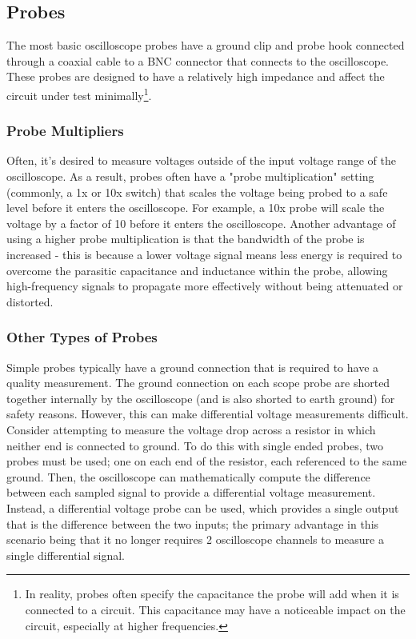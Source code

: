 \documentclass[main.tex]{subfiles}
\begin{document}

\subsection{Probes}
The most basic oscilloscope probes have a ground clip and probe hook connected through a coaxial cable to a BNC connector that connects to the oscilloscope. These probes are designed to have a relatively high impedance and affect the circuit under test minimally\footnote{In reality, probes often specify the capacitance the probe will add when it is connected to a circuit. This capacitance may have a noticeable impact on the circuit, especially at higher frequencies.}. \newline

\subsubsection{Probe Multipliers}
\newnoindentpara Often, it's desired to measure voltages outside of the input voltage range of the oscilloscope. As a result, probes often have a "probe multiplication" setting (commonly, a 1x or 10x switch) that scales the voltage being probed to a safe level before it enters the oscilloscope. For example, a 10x probe will scale the voltage by a factor of 10 before it enters the oscilloscope. Another advantage of using a higher probe multiplication is that the bandwidth of the probe is increased - this is because a lower voltage signal means less energy is required to overcome the parasitic capacitance and inductance within the probe, allowing high-frequency signals to propagate more effectively without being attenuated or distorted. %

\subsubsection{Other Types of Probes}
Simple probes typically have a ground connection that is required to have a quality measurement. The ground connection on each scope probe are shorted together internally by the oscilloscope (and is also shorted to earth ground) for safety reasons. However, this can make differential voltage measurements difficult. Consider attempting to measure the voltage drop across a resistor in which neither end is connected to ground. To do this with single ended probes, two probes must be used; one on each end of the resistor, each referenced to the same ground. Then, the oscilloscope can mathematically compute the difference between each sampled signal to provide a differential voltage measurement. Instead, a differential voltage probe can be used, which provides a single output that is the difference between the two inputs; the primary advantage in this scenario being that it no longer requires 2 oscilloscope channels to measure a single differential signal. \newline 
\end{document}
